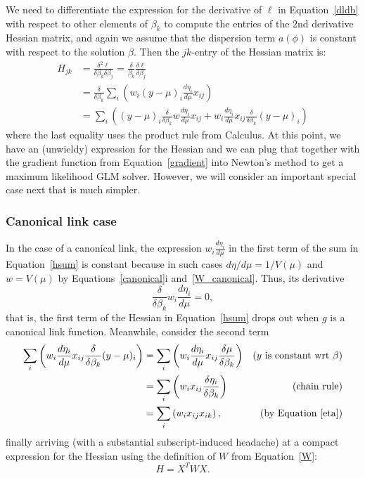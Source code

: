 \documentclass[10pt]{article} %
\begin{document}
We need to differentiate the expression for the derivative of $\ell$ in
Equation~\ref{dldb} with respect to other elements
of $\beta_k$ to compute the entries of the 2nd derivative Hessian matrix,
and again we assume that the dispersion term $a(\phi)$ is constant
with respect to the solution $\beta$. Then the $jk$-entry of the
Hessian matrix is:
\begin{align}
H_{jk} &= \frac{\delta^2\ell}{\delta\beta_k\delta\beta_j}
 = \frac{\delta}{\beta_k}\frac{\delta\ell}{\delta\beta_j} \nonumber\\
&=
\frac{\delta}{\delta\beta_k}
\sum_i\left(
w_i(y-\mu)_i\frac{d\eta_i}{d\mu}x_{ij} \right)\nonumber \\
&= \sum_i\left(
(y-\mu)_i
\frac{\delta}{\delta\beta_k}
w\frac{d\eta_i}{d\mu}x_{ij}
+
w_i\frac{d\eta_i}{d\mu}x_{ij}\frac{\delta}{\delta\beta_k}(y-\mu)_i \label{hsum}
\right)
\end{align}
where the last equality uses the product rule from Calculus.
At this point, we have an (unwieldy) expression for the Hessian and
we can plug that together with the gradient function from Equation~\ref{gradient}
into Newton's method to get a maximum likelihood GLM solver.
However, we will consider an important special case next that is much simpler.

\subsubsection*{Canonical link case}
In the case of a canonical link, the expression $w_i\frac{d\eta_i}{d\mu}$ in the
first term of the sum in Equation~\ref{hsum}
is constant because in such cases
$d\eta/d\mu=1/V(\mu)$ and
$w=V(\mu)$ 
by Equations~\ref{canonical}i and~\ref{W_canonical}. Thus, its derivative
\[
\frac{\delta}{\delta\beta_k} w_i\frac{d\eta_i}{d\mu} = 0,
\]
that is, the first term of the Hessian in Equation~\ref{hsum}
drops out when $g$ is a canonical link function.
Meanwhile, consider the second term
\begin{align*}
\sum_i\left(
w_i\frac{d\eta_i}{d\mu}x_{ij}\frac{\delta}{\delta\beta_k}(y-\mu)_i
\right)  &=
\sum_i\left(
w_i\frac{d\eta_i}{d\mu}x_{ij}\frac{\delta\mu}{\delta\beta_k} \right) &\mbox{($y$ is constant wrt $\beta$)}  \\
&= 
\sum_i\left(
w_ix_{ij}\frac{\delta\eta_i}{\delta\beta_k} \right)&\mbox{(chain rule)}\\
&= 
\sum_i\left(
w_ix_{ij}x_{ik} \right), &\mbox{(by Equation \ref{eta})}
\end{align*}
finally arriving (with a substantial subscript-induced headache) at a compact
expression for the Hessian using the definition of $W$ from Equation~\ref{W}:
\begin{equation}\label{Hessian}
H = X^T W X.
\end{equation}
\end{document}
